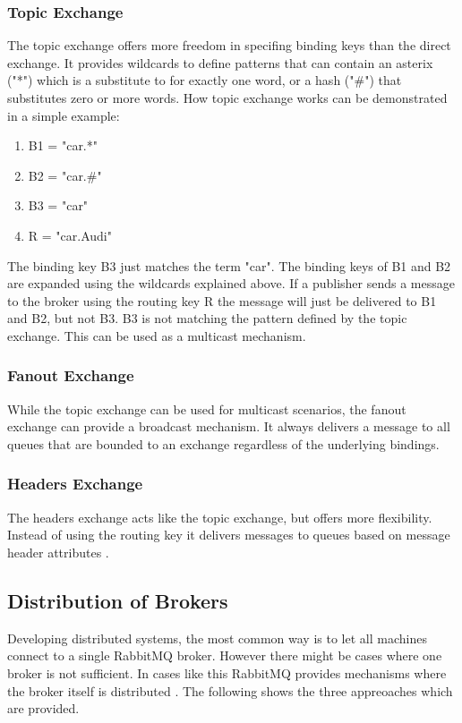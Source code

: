 \subsubsection{Topic Exchange}
The topic exchange offers more freedom in specifing binding keys than the direct exchange. It provides wildcards to define patterns that can contain an asterix ("*") which is a substitute to for exactly one word, or a hash ("\#") that substitutes zero or more words. How topic exchange works can be demonstrated in a simple example:
\begin{enumerate}
	\item B1 = "car.*"
	\item B2 = "car.\#"
	\item B3 = "car"
	\item R = "car.Audi"
\end{enumerate}
The binding key B3 just matches the term "car". The binding keys of B1 and B2 are expanded using the wildcards explained above. If a publisher sends a message to the broker using the routing key R the message will just be delivered to B1 and B2, but not B3. B3 is not matching the pattern defined by the topic exchange. This can be used as a multicast mechanism.

\subsubsection{Fanout Exchange}
While the topic exchange can be used for multicast scenarios, the fanout exchange can provide a broadcast mechanism. It always delivers a message to all queues that are bounded to an exchange regardless of the underlying bindings.

\subsubsection{Headers Exchange}
The headers exchange acts like the topic exchange, but offers more flexibility. Instead of using the routing key it delivers messages to queues based on message header attributes \cite{Toshev2015}.


\subsection{Distribution of Brokers}
Developing distributed systems, the most common way is to let all machines connect to a single RabbitMQ broker. However there might be cases where one broker is not sufficient. In cases like this RabbitMQ provides mechanisms where the broker itself is distributed \cite{pivotal:distributed}. The following shows the three appreoaches which are provided.

